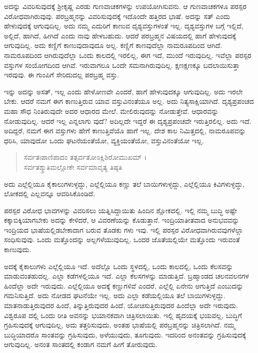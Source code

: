 ಅದನ್ನು ವಿವರಿಸುವುದಕ್ಕೆ ಶ್ರೀಕೃಷ್ಣ ಎರಡು ಗುಣವಾಚಕಗಳನ್ನು ಉಪಯೋಗಿಸುವನು. ಆ ಗುಣವಾಚಕಗಳೂ ಪರಸ್ಪರ ವಿರೋಧವಾಗಿರುವುವು. ಪರಬ್ರಹ್ಮನನ್ನು ವಿವರಿಸುವುದಕ್ಕೆ ಇದೊಂದೇ ಹತ್ತಿರದ ಭಾಷೆ. ಅದನ್ನು ಸತ್ ಎಂದು ಹೇಳುವುದಕ್ಕೆ ಆಗುವುದಿಲ್ಲ. ಅದು ನಮ್ಮ ಎದುರಿಗೆ ಕಾಣುವ ದೃಶ್ಯವಸ್ತುಗಳಂತೆ ಇಲ್ಲ. ದೃಶ್ಯವಸ್ತುಗಳ ಬಗ್ಗೆ ಇಲ್ಲಿದೆ, ಅಲ್ಲಿದೆ, ಹಾಗಿದೆ, ಹೀಗಿದೆ ಎಂದು ನಾವು ಹೇಳಬಹುದು. ಆದರೆ ಪರಬ್ರಹ್ಮನ ವಿಷಯದಲ್ಲಿ ಹಾಗೆ ಹೇಳುವುದಕ್ಕೆ ಆಗುವುದಿಲ್ಲ. ಅದು ಕಣ್ಣಿಗೆ ಕಾಣುವುದಾವುದೂ ಅಲ್ಲ. ಕಣ್ಣಿಗೆ ಕಾಣವುದೆಲ್ಲಾ ನಾಮರೂಪದಿಂದ ಆಗಿದೆ. ನಾಮರೂಪದಿಂದ ಆಗಿರುವುದೆಲ್ಲಾ ಒಂದು ಕಾಲದಲ್ಲಿ ಇರಲಿಲ್ಲ, ಈಗ ಇದೆ, ಮುಂದೆ ಇರುವುದಿಲ್ಲ. ಇವೆಲ್ಲಾ ಪರಸ್ಪರ ವಸ್ತುಗಳ ಸಂಯೋಗದಿಂದ ಆಗಿವೆ. ಇರುವಾಗಲೂ ಒಂದೇ ಸಮನಾಗಿರುವುದಿಲ್ಲ. ಕ್ಷಣಕ್ಷಣಕ್ಕೂ ಬದಲಾಯಿಸುತ್ತಾ ಇರವುವು. ಈ ಗುಂಪಿಗೆ ಸೇರಿದುದಲ್ಲ ಪರಬ್ರಹ್ಮ ವಸ್ತು.

ಇನ್ನು ಅದನ್ನು ಅಸತ್, ಇಲ್ಲ ಎಂದು ಹೇಳೋಣವೇ ಎಂದರೆ, ಹಾಗೆ ಹೇಳುವುದಕ್ಕೂ ಆಗುವುದಿಲ್ಲ. ಅದು ಇರಲೇ ಬೇಕು. ಆದರೆ ನಮಗೆ ಈಗ ಕಾಣುತ್ತಿರುವ ಯಾವ ವಸ್ತುವಿನಂತೆಯೂ ಅಲ್ಲ. ಅದು ನಿತ್ಯಸಾಕ್ಷಿಯಾಗಿದೆ. ದೃಶ್ಯಪ್ರಪಂಚದ ಮಹಾ ಸೌಧ ನಿಂತಿರುವುದೇ ಅದರ ಆಧಾರದ ಮೇಲೆ. ಮೇಲಿರುವುದನ್ನು ನೋಡುತ್ತೇವೆ. ಆಧಾರವನ್ನು ನೋಡುವುದಿಲ್ಲ. ಆದರೆ ಇಲ್ಲ ಎನ್ನಲಾಗು ವುದೆ? ಅದಿಲ್ಲದೇ ಇದ್ದರೆ ಈ ದೃಶ್ಯಪ್ರಪಂಚವೇ ಇರುತ್ತಿರಲಿಲ್ಲ. ಅದು ಇದೆ. ಅದಿದ್ದರೆ, ನಮಗೆ ಈಗ ವಸ್ತುಗಳು ಹೇಗೆ ಕಾಣುತ್ತಿವೆಯೊ ಹಾಗೆ ಇಲ್ಲ. ದೇಶ ಕಾಲ ನಿಮಿತ್ತದಲ್ಲಿ, ನಾಮರೂಪವನ್ನು ಧರಿಸಿ, ಯಾವುದೋ ಒಂದು ಘಟನೆಯಂತೆಯೋ, ವ್ಯಕ್ತಿಯಂತೆಯೋ, ವಸ್ತುವಿನಂತೆಯೋ ಇಲ್ಲ.

\begin{verse}
ಸರ್ವತಃಪಾಣಿಪಾದಂ ತತ್ಸರ್ವತೋಽಕ್ಷಿಶಿರೋಮುಖಮ್ ।\\ಸರ್ವತಶ್ಶ್ರುತಿಮಲ್ಲೋಕೇ ಸರ್ವಮಾವೃತ್ಯ ತಿಷ್ಠತಿ 
\end{verse}

{\small ಅದು ಎಲ್ಲೆಲ್ಲಿಯೂ ಕೈಕಾಲುಗಳುಳ್ಳದ್ದು, ಎಲ್ಲೆಲ್ಲಿಯೂ ಕಣ್ಣು ತಲೆ ಬಾಯಿಗಳುಳ್ಳದ್ದು, ಎಲ್ಲೆಲ್ಲಿಯೂ ಕಿವಿಗಳುಳ್ಳದ್ಧು, ಲೋಕದಲ್ಲಿ ಎಲ್ಲವನ್ನೂ ಆವರಿಸಿಕೊಂಡಿದೆ.}

ಪರಸ್ಪರ ವಿರೋಧ ಭಾವಗಳನ್ನು ವಿವರಿಸಲು ಯತ್ನಿಸಿದ್ದಾಯಿತು ಹಿಂದಿನ ಶ್ಲೋಕದಲ್ಲಿ. ಇಲ್ಲಿ ನಮ್ಮ ಬುದ್ಧಿ ಅಷ್ಟೇ ಕಕ್ಕಾಬಿಕ್ಕಿಯಾಗಬೇಕು ಅದನ್ನು ಕೇಳಿದರೆ, ಆ ವಿವರಣೆಯನ್ನು ಕೊಡುತ್ತಾನೆ. ಇಂದ್ರಿಯಾತೀತವಾದ ಅನುಭವವನ್ನು ಇಂದ್ರಿಯದ ಭಾಷೆಯಲ್ಲಿಡಬೇಕಾದಾಗ ಬರುವ ತೊಡಕು ಗಳು ಇವು. ಇಲ್ಲಿ ಪರಸ್ಪರ ವಿರೋಧವಾಗಿರುವವುಗಳೆಲ್ಲಾ ಸಂಧಿಸುವುವು. ಒಂದು ಮತ್ತೊಂದನ್ನು ಅಲ್ಲಗಳೆಯುವುದಿಲ್ಲ. ಒಂದರ ಜೊತೆಯಲ್ಲಿಯೇ ಮತ್ತೊಂದು ಇರುವಂತೆ ಕಾಣುವುದು.

ಅದಕ್ಕೆ ಕೈಕಾಲುಗಳು ಎಲ್ಲೆಲ್ಲಿಯೂ ಇದೆ. ಅದೆಲ್ಲೊ ಒಂದು ಸ್ಥಳದಲ್ಲಿ, ಒಂದು ಕಾಲದಲ್ಲಿ, ಒಂದು ಕೆಲಸವನ್ನು ಮಾಡುವಂತಹುದಲ್ಲ. ಎಲ್ಲಾ ಕಡೆಗಳಲ್ಲಿಯೂ ಇದೆ. ಎಲ್ಲಾ ಕೆಲಸಗಳನ್ನು ಮಾಡುತ್ತಿದೆ. ಬ್ರಹ್ಮಾಂಡದ ಚಲನವಲನಗಳ ಹಿಂದೆಲ್ಲಾ ಅದೇ ಇರುವುದು. ಎಲ್ಲೆಲ್ಲಿಯೂ ಅದಕ್ಕೆ ಕಣ್ಣುಗಳಿವೆ ಎಂದರೆ, ಎಲ್ಲೆಲ್ಲಿ ಏನೇನು ಆಗುತ್ತಿದೆ ಎಂಬುದನ್ನು ಗಮನಿಸುತ್ತಿದೆ. ಅದು ನೋಡದ ಘಟನೆಯೇ ಇಲ್ಲ. ಅದು ಎಲ್ಲಾ ಕಡೆಯಲ್ಲಿಯೂ ತಲೆ ಬಾಯಿಗಳುಳ್ಳದ್ದು. ಮಾತನಾಡುತ್ತಿರುವುದರ ಹಿಂದೆ, ತಿನ್ನುತ್ತಿರುವುದರ ಹಿಂದೆ, ಯೋಚಿಸುತ್ತಿರುವುದರ ಹಿಂದೆಲ್ಲಾ ಅದೇ ಇರುವುದು. ವಿಶ್ವರೂಪ ದಲ್ಲಿ ಒಂದು ರೀತಿ ಅವನನ್ನು ಭಯಾನಕವಾಗಿ ಚಿತ್ರಿಸಲಾಯಿತು. ಇಲ್ಲಿ ಹೃದಯಕ್ಕೆ ಭಯವಲ್ಲ, ಬುದ್ಧಿಗೆ ಗ್ರಹಿಸುವುದಕ್ಕೆ ಆಗುವುದಿಲ್ಲ, ಅದು ತತ್ತರಿಸುವುದು, ಅಂತಹ ಭಾಷೆಯಲ್ಲಿ ಪರಬ್ರಹ್ಮನನ್ನು ಚಿತ್ರಿಸಲಾಗಿದೆ. ನಮ್ಮ ಬುದ್ಧಿಯಾದರೊ ಸಾಂತವನ್ನು ಗ್ರಹಿಸುವುದು, ಅಳೆಯುವುದು, ತೂಗುವುದು. ಇದರಿಂದ ಅನಂತವನ್ನು ಗ್ರಹಿಸುವುದಕ್ಕೆ ಆಗುವುದಿಲ್ಲ. ಅನಂತ ಸಾಂತದಲ್ಲಿ ಕಂಡಾಗ ನಮಗೆ ಹೀಗೆ ತೋರುವುದು.

